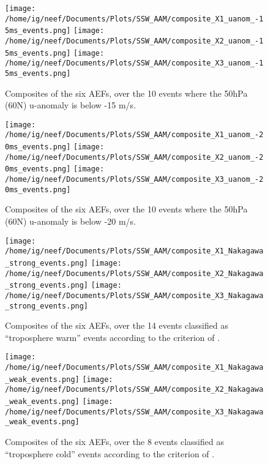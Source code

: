 \documentclass[11pt]{article}
\begin{document}
\begin{figure}
  \noindent
  \texttt{[image: /home/ig/neef/Documents/Plots/SSW\_AAM/composite\_X1\_uanom\_-15ms\_events.png]}
  \texttt{[image: /home/ig/neef/Documents/Plots/SSW\_AAM/composite\_X2\_uanom\_-15ms\_events.png]}
  \texttt{[image: /home/ig/neef/Documents/Plots/SSW\_AAM/composite\_X3\_uanom\_-15ms\_events.png]}
  \caption{Composites of the six AEFs, over the 10 events where the 50hPa (60N) u-anomaly is below -15 m/s.}
   \label{fig:uanom_events_1}
 \end{figure}

\begin{figure}
  \noindent
  \texttt{[image: /home/ig/neef/Documents/Plots/SSW\_AAM/composite\_X1\_uanom\_-20ms\_events.png]}
  \texttt{[image: /home/ig/neef/Documents/Plots/SSW\_AAM/composite\_X2\_uanom\_-20ms\_events.png]}
  \texttt{[image: /home/ig/neef/Documents/Plots/SSW\_AAM/composite\_X3\_uanom\_-20ms\_events.png]}
  \caption{Composites of the six AEFs, over the 10 events where the 50hPa (60N) u-anomaly is below -20 m/s.}
   \label{fig:uanom_events_2}
 \end{figure}

\begin{figure}
  \noindent
  \texttt{[image: /home/ig/neef/Documents/Plots/SSW\_AAM/composite\_X1\_Nakagawa\_strong\_events.png]}
  \texttt{[image: /home/ig/neef/Documents/Plots/SSW\_AAM/composite\_X2\_Nakagawa\_strong\_events.png]}
  \texttt{[image: /home/ig/neef/Documents/Plots/SSW\_AAM/composite\_X3\_Nakagawa\_strong\_events.png]}
  \caption{Composites of the six AEFs, over the 14 events classified as ``troposphere warm'' events according to the criterion of \citet{nakagawayamazaki2006}.}
   \label{fig:nakagawa_strong}
 \end{figure}

\begin{figure}
  \noindent
  \texttt{[image: /home/ig/neef/Documents/Plots/SSW\_AAM/composite\_X1\_Nakagawa\_weak\_events.png]}
  \texttt{[image: /home/ig/neef/Documents/Plots/SSW\_AAM/composite\_X2\_Nakagawa\_weak\_events.png]}
  \texttt{[image: /home/ig/neef/Documents/Plots/SSW\_AAM/composite\_X3\_Nakagawa\_weak\_events.png]}
  \caption{Composites of the six AEFs, over the 8 events classified as ``troposphere cold'' events according to the criterion of \citet{nakagawayamazaki2006}.}
   \label{fig:nakagawa_weak}
 \end{figure}
\end{document}
